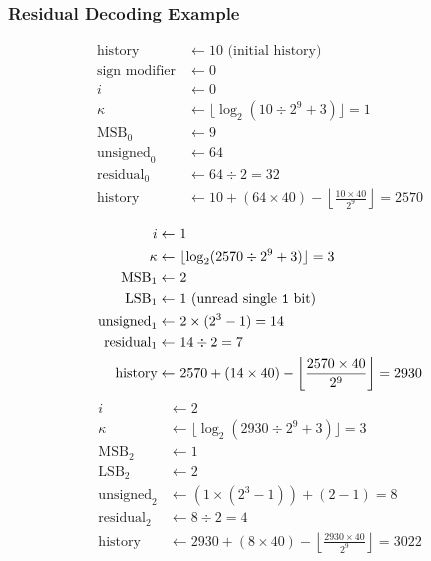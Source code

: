 \clearpage

\subsubsection{Residual Decoding Example}
\begin{align*}
\text{history} &\leftarrow 10 \text{ (initial history)} \\
\text{sign modifier} & \leftarrow 0 \\
i &\leftarrow 0 \\
\kappa & \leftarrow \lfloor\log_2(10 \div 2 ^ 9 + 3)\rfloor = 1 \\
\text{MSB}_0 &\leftarrow 9 \\
\text{unsigned}_0 &\leftarrow 64 \\
\text{residual}_0 &\leftarrow 64 \div 2 = 32 \\
\text{history} &\leftarrow 10 + (64 \times 40) - \left\lfloor\frac{10 \times 40}{2 ^ 9}\right\rfloor = 2570 \\
\end{align*}
\begin{align*}
i &\leftarrow 1 \\
\kappa &\leftarrow \lfloor\log_2(2570 \div 2 ^ 9 + 3)\rfloor = 3 \\
\text{MSB}_1 &\leftarrow 2 \\
\text{LSB}_1 &\leftarrow 1 \text{ (unread single \texttt{1} bit)}\\
\text{unsigned}_1 &\leftarrow 2 \times (2 ^ 3 - 1) = 14 \\
\text{residual}_1 &\leftarrow 14 \div 2 = 7 \\
\text{history} &\leftarrow 2570 + (14 \times 40) - \left\lfloor\frac{2570 \times 40}{2 ^ 9}\right\rfloor = 2930 \\
\end{align*}
\begin{align*}
i &\leftarrow 2 \\
\kappa &\leftarrow \lfloor\log_2(2930 \div 2 ^ 9 + 3)\rfloor = 3 \\
\text{MSB}_2 &\leftarrow 1 \\
\text{LSB}_2 &\leftarrow 2 \\
\text{unsigned}_2 &\leftarrow (1 \times (2 ^ 3 - 1)) + (2 - 1) = 8 \\
\text{residual}_2 &\leftarrow 8 \div 2 = 4 \\
\text{history} &\leftarrow 2930 + (8 \times 40) - \left\lfloor\frac{2930 \times 40}{2 ^ 9}\right\rfloor = 3022 \\
\end{align*}
